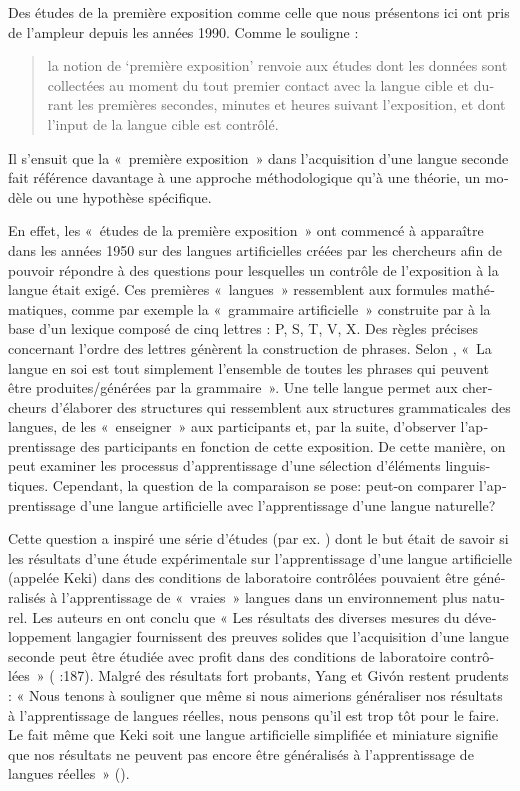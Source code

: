 \documentclass[output=paper]{langscibook}
\begin{document}
\begin{otherlanguage}{french}
Des études de la première exposition comme celle que nous présentons ici ont pris de l’ampleur depuis les années 1990. Comme le souligne \citet[29]{Rast2008}:
\begin{quote}
    la notion de ‘première exposition’ renvoie aux études dont les données sont collectées au moment du tout premier contact avec la langue cible et durant les premières secondes, minutes et heures suivant l’exposition, et dont l'input de la langue cible est contrôlé.
\end{quote} 
Il s’ensuit que la «~première exposition~» dans l’acquisition d’une langue seconde fait référence davantage à une approche méthodologique qu’à une théorie, un modèle ou une hypothèse spécifique.

En effet, les «~études de la première exposition~» ont commencé à apparaître dans les années 1950 sur des langues artificielles créées par les chercheurs afin de pouvoir répondre à des questions pour lesquelles un contrôle de l’exposition à la langue était exigé. Ces premières «~langues~» ressemblent aux formules mathématiques, comme par exemple la «~grammaire artificielle~» construite par \citet{Reber1967} à la base d’un lexique composé de cinq lettres : P, S, T, V, X. Des règles précises concernant l’ordre des lettres génèrent la construction de phrases. Selon \citet[856]{Reber1967}, «~La langue en soi est tout simplement l’ensemble de toutes les phrases qui peuvent être produites/générées par la grammaire~». Une telle langue permet aux chercheurs d’élaborer des structures qui ressemblent aux structures grammaticales des langues, de les «~enseigner~» aux participants et, par la suite, d’observer l’apprentissage des participants en fonction de cette exposition. De cette manière, on peut examiner les processus d’apprentissage d’une sélection d’éléments linguistiques. Cependant, la question de la comparaison se pose: peut-on comparer l’apprentissage d’une langue artificielle avec l’apprentissage d’une langue naturelle?

Cette question a inspiré une série d’études (par ex. \citealt{YangGivón1997}) dont le but était de savoir si les résultats d’une étude expérimentale sur l’apprentissage d’une langue artificielle (appelée Keki) dans des conditions de laboratoire contrôlées pouvaient être généralisés à l’apprentissage de «~vraies~» langues dans un environnement plus naturel. Les auteurs en ont conclu que « Les résultats des diverses mesures du développement langagier fournissent des preuves solides que l'acquisition d'une langue seconde peut être étudiée avec profit dans des conditions de laboratoire contrôlées~» (\citealt{YangGivón1997} :187). Malgré des résultats fort probants, Yang et Givón restent prudents : « Nous tenons à souligner que même si nous aimerions généraliser nos résultats à l'apprentissage de langues réelles, nous pensons qu'il est trop tôt pour le faire. Le fait même que Keki soit une langue artificielle simplifiée et miniature signifie que nos résultats ne peuvent pas encore être généralisés à l'apprentissage de langues réelles~» (\citealt[190]{YangGivón1997}).


\end{otherlanguage}
\end{document}
